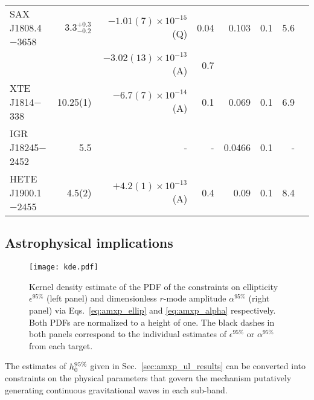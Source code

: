 \begin{landscape}
\begin{table}
{\begin{NiceTabular}{l r r r r r r l}
SAX J1808.4$-$3658  	& \textrm{$3.3^{+0.3}_{-0.2}$} & $-1.01(7)\times 10^{-15}$ (Q)  		& 0.04			& 0.103  	& 0.1   & 5.6  &\cite{Galloway2006, Watts2008, Goodwin2019, Bult2020} \\
						& 				 		 & $-3.02(13)\times 10^{-13}$ (A) & 0.7			& 		  	& 	    & 	   & \\
XTE J1814$-$338     	& \textrm{10.25(1)} 	 & $-6.7(7)\times 10^{-14}$  (A)  				& 0.1			& 0.069  	& 0.1   & 6.9  &\cite{Papitto1814, Watts2008, DAvanzo2009} \\
IGR J18245$-$2452   	& \textrm{5.5}  & -  						   			    	& -				& 0.0466  	& 0.1   & -    &\cite{Harris2010, Papitto18245, Campana2018} \\
HETE J1900.1$-$2455 	& \textrm{4.5(2)} 		 & $+4.2(1)\times 10^{-13}$  (A)  				& 0.4	& 0.09  	& 0.1   & 8.4  &\cite{Suzuki2007, Galloway2008, Patruno1900, Watts2008} \\
\bottomrule
\end{NiceTabular}
}
\end{table}
\end{landscape}

\subsection{Astrophysical implications \label{sec:amxp_ul_impl}}

\begin{figure*}
	\centering
	\texttt{[image: kde.pdf]}
	\caption{Kernel density estimate of the PDF of the constraints on ellipticity $\epsilon^{95\%}$ (left panel) and dimensionless $r$-mode amplitude $\alpha^{95\%}$ (right panel) via Eqs.~\eqref{eq:amxp_ellip} and \eqref{eq:amxp_alpha} respectively. Both PDFs are normalized to a height of one. The black dashes in both panels correspond to the individual estimates of $\epsilon^{95\%}$ or $\alpha^{95\%}$ from each target.}
	\label{fig:amxp_kde}
\end{figure*}

The estimates of $h_0^{95\%}$ given in Sec.~\ref{sec:amxp_ul_results} can be converted into constraints on the physical parameters that govern the mechanism putatively generating continuous gravitational waves in each sub-band.

